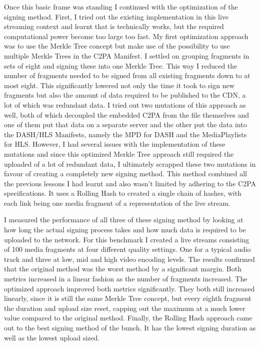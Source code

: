 Once this basic frame was standing I continued with the optimization of the signing method. First, I tried out the existing implementation in this live streaming context and learnt that is technically works, but the required computational power become too large too fast. My first optimization approach was to use the Merkle Tree concept but make use of the possibility to use multiple Merkle Trees in the C2PA Manifest. I settled on grouping fragments in sets of eight and signing these into one Merkle Tree. This way I reduced the number of fragments needed to be signed from all existing fragments down to at most eight. This significantly lowered not only the time it took to sign new fragments but also the amount of data required to be published to the CDN, a lot of which was redundant data. I tried out two mutations of this approach as well, both of which decoupled the embedded C2PA from the file themselves and one of them put that data on a separate server and the other put the data into the DASH/HLS Manifests, namely the MPD for DASH and the MediaPlaylists for HLS. However, I had several issues with the implementation of these mutations and since this optimized Merkle Tree approach still required the uploaded of a lot of redundant data, I ultimately scrapped these two mutations in favour of creating a completely new signing method. This method combined all the previous lessons I had learnt and also wasn't limited by adhering to the C2PA specifications. It uses a Rolling Hash to created a single chain of hashes, with each link being one media fragment of a representation of the live stream.

I measured the performance of all three of these signing method by looking at how long the actual signing process takes and how much data is required to be uploaded to the network. For this benchmark I created a live streams consisting of 100 media fragments at four different quality settings. One for a typical audio track and three at low, mid and high video encoding levels. The results confirmed that the original method was the worst method by a significant margin. Both metrics increased in a linear fashion as the number of fragments increased. The optimized approach improved both metrics significantly. They both still increased linearly, since it is still the same Merkle Tree concept, but every eighth fragment the duration and upload size reset, capping out the maximum at a much lower value compared to the original method. Finally, the Rolling Hash approach came out to the best signing method of the bunch. It has the lowest signing duration as well as the lowest upload sized.

